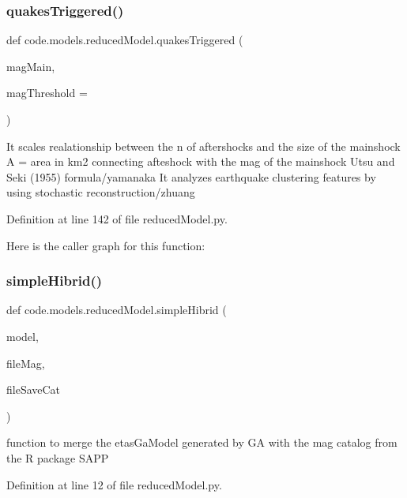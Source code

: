 \subsubsection{\texorpdfstring{quakes\+Triggered()}{quakesTriggered()}}
{\footnotesize\ttfamily def code.\+models.\+reduced\+Model.\+quakes\+Triggered (\begin{DoxyParamCaption}\item[{}]{mag\+Main,  }\item[{}]{mag\+Threshold = {} }\end{DoxyParamCaption})}

\begin{DoxyVerb}It scales realationship between the n of aftershocks and the size of the mainshock
A = area in km2 connecting afteshock with the mag of the mainshock
Utsu and Seki (1955) formula/yamanaka
It analyzes earthquake clustering features by using stochastic reconstruction/zhuang
\end{DoxyVerb}
 

Definition at line 142 of file reduced\+Model.\+py.

Here is the caller graph for this function\+:
\mbox{\label{namespacecode_1_1models_1_1reduced_model_a43abc851d51b4127ff18ecf49274b7e8}} 
\subsubsection{\texorpdfstring{simple\+Hibrid()}{simpleHibrid()}}
{\footnotesize\ttfamily def code.\+models.\+reduced\+Model.\+simple\+Hibrid (\begin{DoxyParamCaption}\item[{}]{model,  }\item[{}]{file\+Mag,  }\item[{}]{file\+Save\+Cat }\end{DoxyParamCaption})}

\begin{DoxyVerb}function to merge the etasGaModel generated by GA with the mag catalog from the R package SAPP 
\end{DoxyVerb}
 

Definition at line 12 of file reduced\+Model.\+py.

